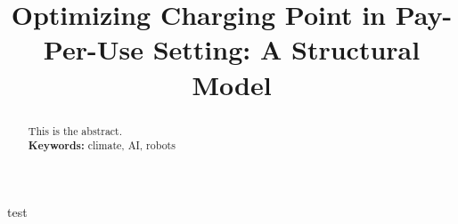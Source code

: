 \documentclass{ssrn}
\title{Optimizing Charging Point in Pay-Per-Use Setting: A Structural Model}
\begin{document}
\maketitle
\begin{abstract}

    This is the abstract.
    \vspace{1em}\\
    \noindent\textbf{Keywords:} climate, AI, robots\\
    \bigskip
\end{abstract}
\newpage
test

\end{document}
